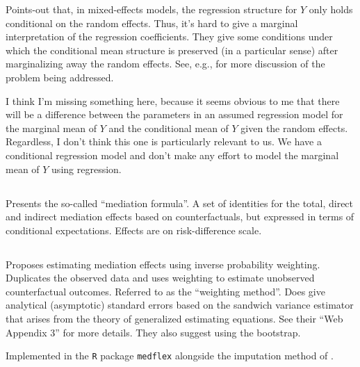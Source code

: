 \documentclass{report}
\begin{document}
Points-out that, in mixed-effects models, the regression structure for $Y$ only holds conditional on the random effects. Thus, it's hard to give a marginal interpretation of the regression coefficients. They give some conditions under which the conditional mean structure is preserved (in a particular sense) after marginalizing away the random effects. See, e.g., \citet{Neu91} for more discussion of the problem being addressed.

I think I'm missing something here, because it seems obvious to me that there will be a difference between the parameters in an assumed regression model for the marginal mean of $Y$ and the conditional mean of $Y$ given the random effects. Regardless, I don't think this one is particularly relevant to us. We have a conditional regression model and don't make any effort to model the marginal mean of $Y$ using regression.





\subsection{\citet{Pea12}}

Presents the so-called ``mediation formula''. A set of identities for the total, direct and indirect mediation effects based on counterfactuals, but expressed in terms of conditional expectations. Effects are on risk-difference scale.

\subsection{\citet{Lan12}}

Proposes estimating mediation effects using inverse probability weighting. Duplicates the observed data and uses weighting to estimate unobserved counterfactual outcomes. Referred to as the ``weighting method''. Does give analytical (asymptotic) standard errors based on the sandwich variance estimator that arises from the theory of generalized estimating equations. See their ``Web Appendix 3'' for more details. They also suggest using the bootstrap. 

Implemented in the \texttt{R} package \texttt{medflex} \citep{Ste17} alongside the imputation method of \citet{Van12}.

\subsection{\citet{Van12}}
\end{document}
